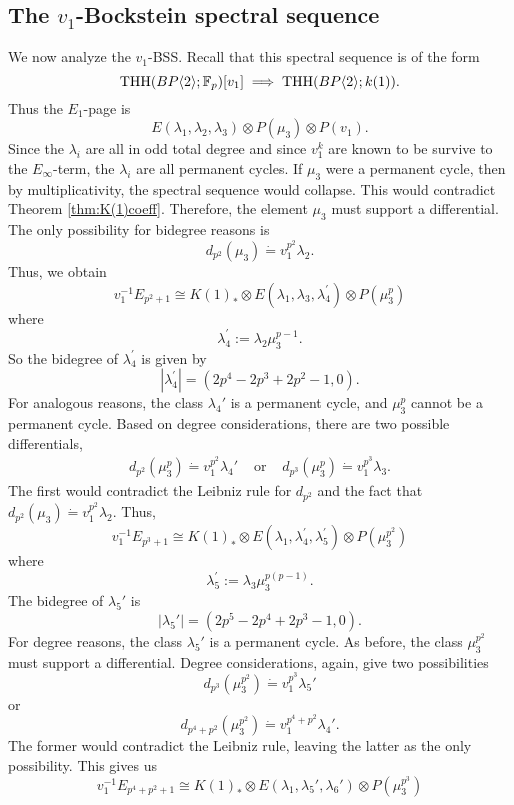 
\subsection{The $v_1$-Bockstein spectral sequence}
We now analyze the $v_1$-BSS. Recall that this spectral sequence is of the form 
\[
\operatorname{THH}(BP\langle 2 \rangle;\mathbb{F}_p)[v_1]\implies \operatorname{THH}(BP\langle 2 \rangle;k(1)).
\]
Thus the $E_1$-page is 
\begin{equation}\label{v_1bockinput}
E(\lambda_1, \lambda_2, \lambda_3)\otimes P(\mu_3)\otimes P(v_1). 
\end{equation}
Since the $\lambda_i$ are all in odd total degree and since $v_1^k$ are known to be survive to the $E_{\infty}$-term, the $\lambda_i$ are all permanent cycles. If $\mu_3$ were a permanent cycle, then by multiplicativity, the spectral sequence would collapse. This would contradict Theorem \ref{thm:K(1)coeff}. Therefore, the element $\mu_3$ must support a differential. The only possibility for bidegree reasons is
\[
d_{p^2}(\mu_3)\dot{=}v_1^{p^2}\lambda_2.
\]
Thus, we obtain 
\[
v_1^{-1}E_{p^2+1}\cong K(1)_*\otimes E(\lambda_1, \lambda_3,\lambda_4^{\prime})\otimes P(\mu_3^p)
\]
where 
\[
\lambda_4^{\prime}:= \lambda_2\mu_3^{p-1}.
\]
So the bidegree of $\lambda_4^{\prime}$ is given by 
\[
|\lambda_4^{\prime}|= (2p^4-2p^3+2p^2-1,0).
\]
For analogous reasons, the class $\lambda_4'$ is a permanent cycle, and $\mu_3^p$ cannot be a permanent cycle. Based on degree considerations, there are two possible differentials, 
\[
\begin{array}{ccc}
d_{p^2}(\mu_3^p)\dot{=} v_1^{p^2}\lambda_4' &\text{ or } &d_{p^3}(\mu_3^p)\dot{=}v_1^{p^3}\lambda_3.
\end{array}
\]
The first would contradict the Leibniz rule for $d_{p^2}$ and the fact that $d_{p^2}(\mu_3)\dot{=}v_1^{p^2}\lambda_2$. Thus, 
\[
v_1^{-1}E_{p^3+1}\cong K(1)_*\otimes E(\lambda_1, \lambda_4^{\prime}, \lambda_5^{\prime})\otimes P(\mu_3^{p^2})
\]
where
\[
\lambda_5^{\prime}:= \lambda_3\mu_3^{p(p-1)} .
\]
The bidegree of $\lambda_5'$ is 
\[
|\lambda_5'|=(2p^5-2p^4+2p^3-1,0).
\]
For degree reasons, the class $\lambda_5'$ is a permanent cycle. As before, the class $\mu_3^{p^2}$ must support a differential. Degree considerations, again, give two possibilities
\[
d_{p^3}(\mu_3^{p^2})\dot{=}v_1^{p^3}\lambda_5'
\]
or 
\[
d_{p^4+p^2}(\mu_3^{p^2}) \dot{=} v_1^{p^4+p^2}\lambda_4'.
\]
The former would contradict the Leibniz rule, leaving the latter as the only possibility. This gives us
\[
v_1^{-1}E_{p^4+p^2+1}\cong K(1)_*\otimes E(\lambda_1, \lambda_5', \lambda_6')\otimes P(\mu_3^{p^3})
\]
